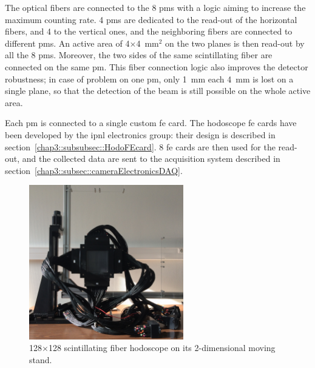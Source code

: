 The optical fibers are connected to the 8 \glspl{pm} with a logic aiming to increase the maximum counting rate. 4 \glspl{pm} are dedicated to the read-out of the horizontal fibers, and 4 to the vertical ones, and the neighboring fibers are connected to different \glspl{pm}. An active area of 4$\times$4~mm$^{2}$ on the two planes is then read-out by all the 8 \glspl{pm}. Moreover, the two sides of the same scintillating fiber are connected on the same \gls{pm}. This fiber connection logic also improves the detector robustness; in case of problem on one \gls{pm}, only 1~mm each 4~mm is lost on a single plane, so that the detection of the beam is still possible on the whole active area.
 
Each \gls{pm} is connected to a single custom \gls{fe} card. The hodoscope \gls{fe} cards have been developed by the \gls{ipnl} electronics group: their design is described in section~\ref{chap3::subsubsec::HodoFEcard}. 8 \gls{fe} cards are then used for the read-out, and the collected data are sent to the acquisition system described in section~\ref{chap3::subsec::cameraElectronicsDAQ}.

\begin{figure}[!htbp]
\centering
\includegraphics[width=0.6\textwidth]{03_GraphicFiles/chapter3_CLaRySproto/Hodoscope/Hodoscope_onTable.jpg}
\caption{128$\times$128 scintillating fiber hodoscope on its 2-dimensional moving stand.}
\label{chap3::fig::HodoscopeMain}
\end{figure}

